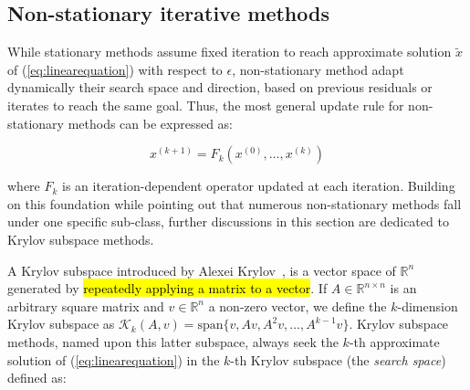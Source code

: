        
        
        
    



\subsection{Non-stationary iterative methods}

While stationary methods assume fixed iteration to reach approximate solution $\tilde{x}$ of (\ref{eq:linearequation}) with respect to $\epsilon$, non-stationary method adapt dynamically their search space and direction, based on previous residuals or iterates to reach the same goal. Thus, the most general update rule for non-stationary methods can be expressed as:

\begin{equation}
     x^{(k+1)}  = F_k(x^{(0)},\dots,x^{(k)})
    \label{eq:nonStationaryMethodEquation}
\end{equation}

where $F_k$ is an iteration-dependent operator updated at each iteration. Building on this foundation while pointing out that numerous non-stationary methods fall under one specific sub-class, further discussions in this section are dedicated to Krylov subspace methods.

A Krylov subspace introduced by Alexei Krylov~\cite{krylov_numerical_1931}, is a vector space of $\mathbb{R}^n$ generated by \hl{repeatedly applying a matrix to a vector}. If $A \in \mathbb{R}^{n \times n}$ is an arbitrary square matrix and $v \in \mathbb{R}^{n}$ a non-zero vector, we define the $k$-dimension Krylov subspace as $\mathcal{K}_k(A, v) = \text{span} \{ v, Av, A^2v, \dots, A^{k-1}v \}$. Krylov subspace methods, named upon this latter subspace, always seek the $k$-th approximate solution of (\ref{eq:linearequation}) in the $k$-th Krylov subspace (the \textit{search space}) defined as:

